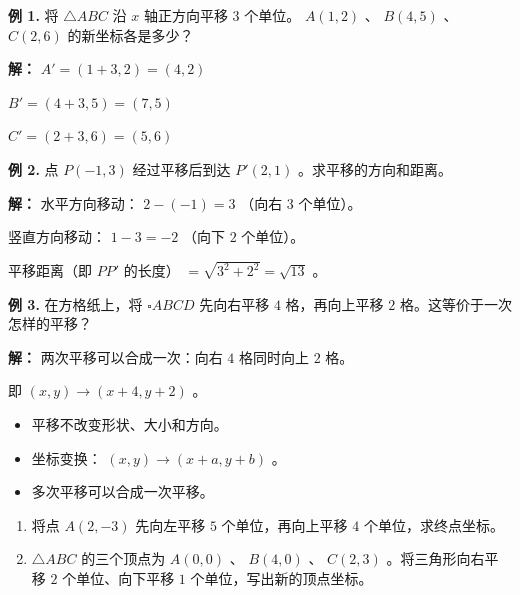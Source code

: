 \begin{workedexamples}


\textbf{例 1.} 将 $\triangle ABC$ 沿 $x$ 轴正方向平移 $3$ 个单位。 $A(1, 2)$ 、 $B(4, 5)$ 、 $C(2, 6)$ 的新坐标各是多少？

\textbf{解：}
$A' = (1 + 3, 2) = (4, 2)$

$B' = (4 + 3, 5) = (7, 5)$

$C' = (2 + 3, 6) = (5, 6)$

\textbf{例 2.} 点 $P(-1, 3)$ 经过平移后到达 $P'(2, 1)$ 。求平移的方向和距离。

\textbf{解：}
水平方向移动： $2 - (-1) = 3$ （向右 $3$ 个单位）。

竖直方向移动： $1 - 3 = -2$ （向下 $2$ 个单位）。

平移距离（即 $PP'$ 的长度） $= \sqrt{3^2 + 2^2} = \sqrt{13}$ 。

\textbf{例 3.} 在方格纸上，将 $\square ABCD$ 先向右平移 $4$ 格，再向上平移 $2$ 格。这等价于一次怎样的平移？

\textbf{解：}
两次平移可以合成一次：向右 $4$ 格同时向上 $2$ 格。

即 $(x, y) \to (x + 4, y + 2)$ 。

\end{workedexamples}

\begin{keytakeaway}


\begin{itemize}
  \item 平移不改变形状、大小和方向。
  \item 坐标变换： $(x, y) \to (x + a, y + b)$ 。
  \item 多次平移可以合成一次平移。
\end{itemize}


\end{keytakeaway}

\begin{practice}


\begin{enumerate}
  \item 将点 $A(2, -3)$ 先向左平移 $5$ 个单位，再向上平移 $4$ 个单位，求终点坐标。
  \item $\triangle ABC$ 的三个顶点为 $A(0, 0)$ 、 $B(4, 0)$ 、 $C(2, 3)$ 。将三角形向右平移 $2$ 个单位、向下平移 $1$ 个单位，写出新的顶点坐标。
\end{enumerate}


\end{practice}




